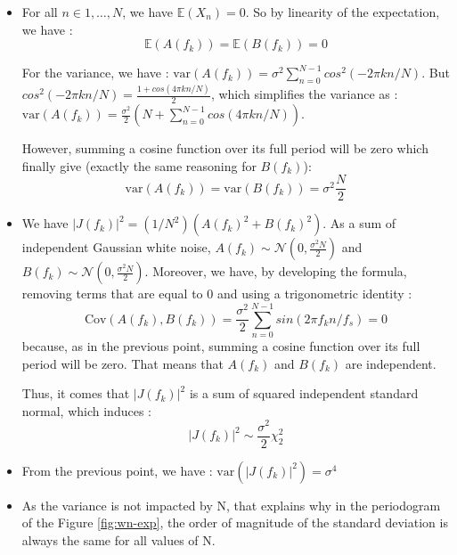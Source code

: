 \documentclass[11pt]{article}
\begin{document}
\begin{solution}
    \begin{itemize}
        \item For all $n\in{1,\dots,N}$, we have $\mathbb{E}(X_n)=0$. So by linearity of the expectation, we have :
        \begin{equation}
            \mathbb{E}(A(f_k))=\mathbb{E}(B(f_k))=0
        \end{equation}

        For the variance, we have : $\text{var}(A(f_k))=\sigma^2\sum_{n=0}^{N-1}cos^2(-2\pi kn/N)$. But $cos^2(-2\pi kn/N)=\frac{1+cos(4\pi kn/N)}{2}$, which simplifies the variance as : $\text{var}(A(f_k))=\frac{\sigma^2}{2}(N+\sum_{n=0}^{N-1}cos(4\pi kn/N))$. 

        However, summing a cosine function over its full period will be zero which finally give (exactly the same reasoning for $B(f_k)$): 
        \begin{equation}
            \text{var}(A(f_k))=\text{var}(B(f_k))=\sigma^2\frac{N}{2}
        \end{equation}
        \item We have $|J(f_k)|^2 = (1/N^2) (A(f_k)^2 + B(f_k)^2)$.
        As a sum of independent Gaussian white noise, $A(f_k)\sim\mathcal{N}(0, \frac{\sigma^2N}{2})$ and $B(f_k)\sim\mathcal{N}(0, \frac{\sigma^2N}{2})$. Moreover, we have, by developing the formula, removing terms that are equal to 0 and using a trigonometric identity : 
        \begin{equation}
            \text{Cov}(A(f_k),B(f_k))=\frac{\sigma^2}{2}\sum_{n=0}^{N-1}sin(2 \pi f_k n/f_s) = 0
        \end{equation}
        because, as in the previous point, summing a cosine function over its full period will be zero. That means that $A(f_k)$ and $B(f_k)$ are independent.
        
        Thus, it comes that $|J(f_k)|^2$ is a sum of squared independent standard normal, which induces : 
        \begin{equation}
            |J(f_k)|^2\sim\frac{\sigma^2}{2}\chi_2^2
        \end{equation}
        \item From the previous point, we have : $\text{var}(|J(f_k)|^2)=\sigma^4$
        \item As the variance is not impacted by N, that explains why in the periodogram of the Figure \ref{fig:wn-exp}, the order of magnitude of the standard deviation is always the same for all values of N. 
    \end{itemize}
\end{solution}
\end{document}
